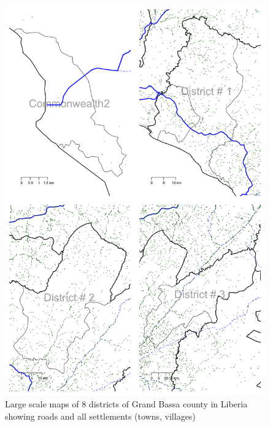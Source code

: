\documentclass[12pt,a4paper]{book}
\theoremstyle{definition}
\theoremstyle{definition}
\theoremstyle{definition}
\theoremstyle{remark}
\begin{document}
\begin{figure}[H]

{\centering \includegraphics{figures/largeScaleMapDistricts2-1} 

}

\caption{Large scale maps of 8 districts of Grand Bassa county in Liberia showing roads and all settlements (towns, villages)}\label{fig:largeScaleMapDistricts2}
\end{figure}

\newpage
\end{document}
